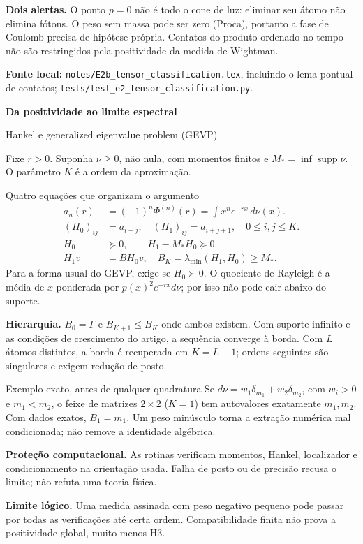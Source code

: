 \documentclass[11pt,a4paper]{article}
\newcommand{\titlepageof}[3]{\vspace*{2mm}{\small\color{rust}\textbf{#1}}\par
 {\LARGE\bfseries\color{ink}#2}\par{\large #3}\par\vspace{2mm}}
\newcommand{\source}[1]{\vfill{\footnotesize\raggedright\color{ink}\textbf{Fonte local:} #1\par}}
\newcommand{\M}{M_*}
\begin{document}
\textbf{Dois alertas.} O ponto $p=0$ não é todo o cone de luz: eliminar seu
átomo não elimina fótons. O peso sem massa pode ser zero (Proca), portanto
a fase de Coulomb precisa de hipótese própria. Contatos do produto ordenado
no tempo não são restringidos pela positividade da medida de Wightman.
\source{\texttt{notes/E2b\_tensor\_classification.tex}, incluindo o lema
pontual de contatos; \texttt{tests/test\_e2\_tensor\_classification.py}.}
\newpage
\titlepageof{05 / MECANISMO MATEMÁTICO}{Da positividade ao limite espectral}{Hankel e generalized eigenvalue problem (GEVP)}
Fixe $r>0$. Suponha $\nu\ge0$, não nula, com momentos finitos e
$\M=\inf\operatorname{supp}\nu$. O parâmetro $K$ é a ordem da aproximação.
\begin{panel}{Quatro equações que organizam o argumento}
\begin{align*}
 a_n(r)&=(-1)^n\Phi^{(n)}(r)=\int x^ne^{-rx}\,d\nu(x).\tag{1}\\
 (H_0)_{ij}&=a_{i+j},\quad(H_1)_{ij}=a_{i+j+1},\quad 0\le i,j\le K.\tag{2}\\
 H_0&\succeq0,\qquad H_1-\M H_0\succeq0.\tag{3}\\
 H_1v&=B H_0v,\quad B_K=\lambda_{\min}(H_1,H_0)\ge\M.\tag{4}
\end{align*}
Para a forma usual do GEVP, exige-se $H_0\succ0$.
O quociente de Rayleigh é a média de $x$ ponderada por
$p(x)^2e^{-rx}d\nu$; por isso não pode cair abaixo do suporte.
\end{panel}
\textbf{Hierarquia.} $B_0=\Gamma$ e $B_{K+1}\le B_K$ onde ambos existem.
Com suporte infinito e as condições de crescimento do artigo, a sequência
converge à borda. Com $L$ átomos distintos, a borda é recuperada em
$K=L-1$; ordens seguintes são singulares e exigem redução de posto.

\begin{panel}{Exemplo exato, antes de qualquer quadratura}
Se $d\nu=w_1\delta_{m_1}+w_2\delta_{m_2}$, com $w_i>0$ e $m_1<m_2$,
o feixe de matrizes $2\times2$ ($K=1$) tem autovalores exatamente $m_1,m_2$.
Com dados exatos, $B_1=m_1$. Um peso minúsculo torna a extração numérica
mal condicionada; não remove a identidade algébrica.
\end{panel}
\textbf{Proteção computacional.} As rotinas verificam momentos, Hankel,
localizador e condicionamento na orientação usada. Falha de posto ou de
precisão recusa o limite; não refuta uma teoria física.

\textbf{Limite lógico.} Uma medida assinada com peso negativo pequeno pode
passar por todas as verificações até certa ordem. Compatibilidade finita
não prova a positividade global, muito menos H3.
\end{document}
